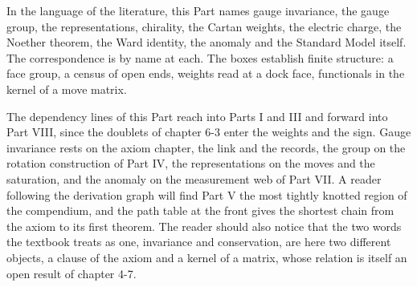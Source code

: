 In the language of the literature, this Part names gauge invariance, the gauge group, the representations, chirality, the Cartan weights, the electric charge, the Noether theorem, the Ward identity, the anomaly and the Standard Model itself. The correspondence is by name at each. The boxes establish finite structure: a face group, a census of open ends, weights read at a dock face, functionals in the kernel of a move matrix.

The dependency lines of this Part reach into Parts I and III and forward into Part VIII, since the doublets of chapter 6-3 enter the weights and the sign. Gauge invariance rests on the axiom chapter, the link and the records, the group on the rotation construction of Part IV, the representations on the moves and the saturation, and the anomaly on the measurement web of Part VII. A reader following the derivation graph will find Part V the most tightly knotted region of the compendium, and the path table at the front gives the shortest chain from the axiom to its first theorem. The reader should also notice that the two words the textbook treats as one, invariance and conservation, are here two different objects, a clause of the axiom and a kernel of a matrix, whose relation is itself an open result of chapter 4-7.
